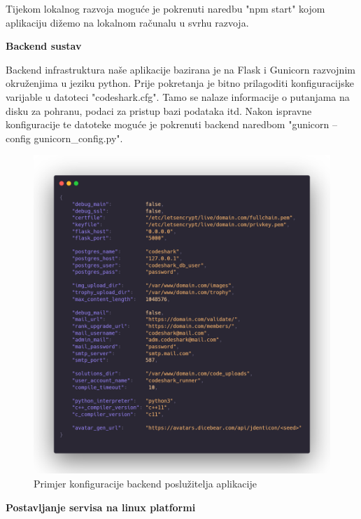 			Tijekom lokalnog razvoja moguće je pokrenuti naredbu "npm start" kojom aplikaciju dižemo na lokalnom računalu u svrhu razvoja.\newline
			
			\textbf{Backend sustav}
			
			Backend infrastruktura naše aplikacije bazirana je na Flask i Gunicorn razvojnim okruženjima u jeziku python. Prije pokretanja je bitno prilagoditi konfiguracijske varijable u datoteci "codeshark.cfg". Tamo se nalaze informacije o putanjama na disku za pohranu, podaci za pristup bazi podataka itd. Nakon ispravne konfiguracije te datoteke moguće je pokrenuti backend naredbom "gunicorn --config gunicorn\_config.py".\newline
			
			\begin{figure}[H]
				\includegraphics[width=\textwidth]{slike/backendKonfiguracija.png} %
				\caption{Primjer konfiguracije backend poslužitelja aplikacije}
				\label{fig:DijagramRazmještaja} %
			\end{figure}
			
			
			\textbf{Postavljanje servisa na linux platformi}\\
			

